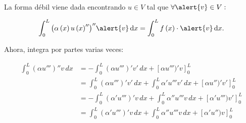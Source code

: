 \begin{frame}[fragile]
\begin{solution}
        La forma débil viene dada encontrando $u\in V$ tal que $\forall \alert{v} \in V:$

        \begin{equation*}
            \int_{0}^{L}
            {
            \left(
            \alpha\left(x\right)
                {u\left(x\right)}^{\prime\prime}
            \right)
            }^{\prime\prime}
            \alert{v}\dl x =
            \int_{0}^{L}
            f\left(x\right)\cdot
            \alert{v}
            \dl x.
        \end{equation*}

        Ahora, integra por partes varias veces:

        \begin{align*}
            \int_0^L (\alpha u''')'' v \,dx & = -\int_0^L (\alpha u''')'v' \,dx + [\alpha u''')'v]_0^L                                 \\
                                            & = \int_0^L (\alpha u''')'v' \,dx + \int_0^L \alpha' u'''v' \,dx + [\alpha u'')'v']_0^L   \\
                                            & = -\int_0^L (\alpha' u''')'v \,dx + \int_0^L \alpha'' u'''v \,dx + [\alpha' u''')v']_0^L \\
                                            & = \int_0^L (\alpha' u''')'v \,dx + \int_0^L \alpha'' u'''v \,dx + [\alpha' u'')v]_0^L
        \end{align*}
    \end{solution}
\end{frame}

